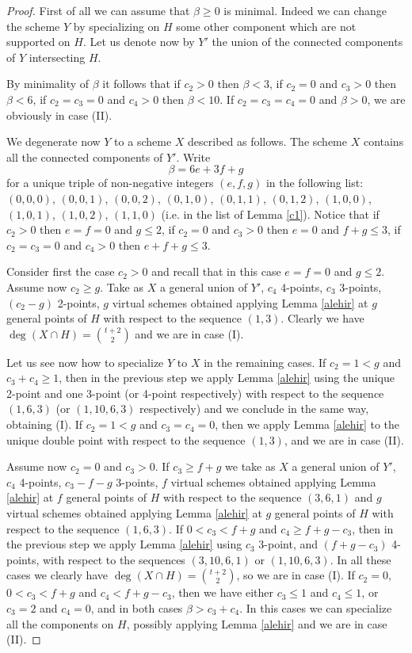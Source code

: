\documentclass{amsart}
\theoremstyle{plain}
\theoremstyle{definition}
\begin{document}
\begin{proof}
First of all we can assume that $\beta\ge0$ is minimal.
Indeed we can change the scheme $Y$ by specializing on $H$ some other
component which are not supported on $H$. Let us denote now  by $Y'$
the union of the connected components of $Y$ intersecting $H$.

By minimality of $\beta$ it follows that if $c_2>0$ then $\beta< 3$,
if $c_2=0$ and $c_3>0$ then $\beta< 6$, if $c_2=c_3=0$ and $c_4>0$ then
$\beta< 10$. If  $c_2=c_3=c_4=0$ and $\beta>0$, we are obviously in case
(II).

We degenerate now $Y$ to a scheme $X$ described as follows.
The scheme $X$ contains all the connected components of $Y'$.
Write
$$\beta= 6e+3f+g$$
 for a unique triple of non-negative integers $(e,f,g)$ in the following list:
$(0,0,0)$, $(0,0,1)$, $(0,0,2)$, $(0,1,0)$, $(0,1,1)$, $(0,1,2)$, $(1,0,0)$,
$(1,0,1)$, $(1,0,2)$,  $(1,1,0)$ (i.e. in the list of Lemma \ref{c1}).
Notice that if $c_2>0$ then $e=f=0$ and $g\le 2$, if $c_2=0$ and $c_3>0$ then
$e=0$ and $f+g\le 3$, if $c_2=c_3=0$ and $c_4>0$ then $e+f+g\le3$.

Consider first the case $c_2>0$ and recall that in this case $e=f=0$
and $g\le2$. Assume now $c_2 \ge g$. Take as $X$ a general union
of $Y'$, $c_4$ 4-points, $c_3$ 3-points, $(c_2-g)$ 2-points,
$g$ virtual schemes obtained applying Lemma \ref{alehir}
at $g$ general points of $H$ with respect to the sequence
$(1,3)$. Clearly we have $\deg(X\cap H)=\binom{t+2}{2}$ and we are in case (I).

Let us see now how to specialize $Y$ to $X$ in the remaining cases.
If $c_2 =1<g$ and $c_3+c_4\ge1$, then in the previous step we apply
Lemma \ref{alehir} using the unique 2-point and one 3-point (or
4-point respectively) with respect to the sequence
$(1,6,3)$ (or $(1,10,6,3)$ respectively) and we conclude in the
same way, obtaining (I).
If $c_2 =1<g$ and $c_3=c_4=0$, then we apply  Lemma \ref{alehir} to
the unique double point with respect to the sequence $(1,3)$, and we
are in case (II).

Assume now $c_2=0$ and $c_3>0$.
If $c_3\ge f+g$ we take as $X$ a general union
of $Y'$, $c_4 $ 4-points, $c_3-f-g$ $3$-points,
$f$ virtual schemes obtained applying Lemma \ref{alehir} at $f$
general points of $H$ with respect to
the sequence $(3,6,1)$ and $g$ virtual schemes obtained applying
Lemma \ref{alehir} at $g$ general points of $H$ with respect to the sequence
$(1,6,3)$.
If $0<c_3<f+g$ and $c_4\ge f+g-c_3$, then in the previous step we
apply Lemma \ref{alehir} using $c_3$ 3-point, and $(f+g-c_3)$ 4-points,
with respect to the sequences $(3,10,6,1)$ or $(1,10,6,3)$.
In all these cases we clearly have $\deg(X\cap H)=\binom{t+2}{2}$, so we are in case (I).
If  $c_2=0$, $0<c_3<f+g$ and $c_4< f+g-c_3$, then we have either
$c_3\le1$ and $c_4\le1$, or $c_3=2$ and $c_4=0$, and in both cases
$\beta>c_3+c_4$. In this cases we can specialize all the components on
$H$, possibly applying Lemma \ref{alehir} and we are in case (II).


\end{proof}
\end{document}
